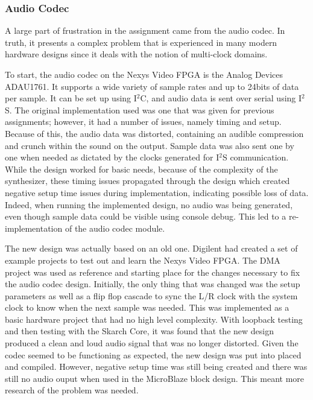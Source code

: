 \documentclass[12pt]{article}
\begin{document}
\subsubsection{Audio Codec}

A large part of frustration in the assignment came from the audio codec. In truth, it presents a complex problem that is experienced in many modern hardware designs since it deals with the notion of multi-clock domains.

To start, the audio codec on the Nexys Video FPGA is the Analog Devices ADAU1761. It supports a wide variety of sample rates and up to 24bits of data per sample. It can be set up using I$^2$C, and audio data is sent over serial using I$^2$S. The original implementation used was one that was given for previous assignments; however, it had a number of issues, namely timing and setup. Because of this, the audio data was distorted, containing an audible compression and crunch within the sound on the output. Sample data was also sent one by one when needed as dictated by the clocks generated for I$^2$S communication. While the design worked for basic needs, because of the complexity of the synthesizer, these timing issues propagated through the design which created negative setup time issues during implementation, indicating possible loss of data. Indeed, when running the implemented design, no audio was being generated, even though sample data could be visible using console debug. This led to a re-implementation of the audio codec module.

The new design was actually based on an old one. Digilent had created a set of example projects to test out and learn the Nexys Video FPGA. The DMA project was used as reference and starting place for the changes necessary to fix the audio codec design. Initially, the only thing that was changed was the setup parameters as well as a flip flop cascade to sync the L/R clock with the system clock to know when the next sample was needed. This was implemented as a basic hardware project that had no high level complexity. With loopback testing and then testing with the Skarch Core, it was found that the new design produced a clean and loud audio signal that was no longer distorted. Given the codec seemed to be functioning as expected, the new design was put into placed and compiled. However, negative setup time was still being created and there was still no audio ouput when used in the MicroBlaze block design. This meant more research of the problem was needed.
\end{document}
